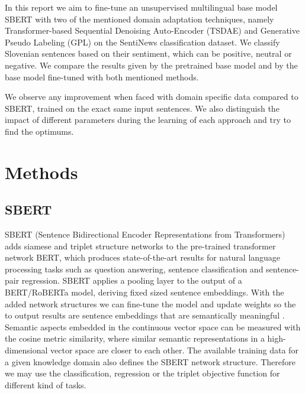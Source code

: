 \documentclass[fleqn,moreauthors,10pt]{ds_report}
\begin{document}
In this report we aim to fine-tune an unsupervised multilingual base model SBERT with two of the mentioned domain adaptation techniques, namely Transformer-based Sequential Denoising Auto-Encoder (TSDAE) and Generative Pseudo Labeling (GPL) on the SentiNews classification dataset. We classify Slovenian sentences based on their sentiment, which can be positive, neutral or negative. We compare the results given by the pretrained base model and by the base model fine-tuned with both mentioned methods.

We observe any improvement when faced with domain specific data compared to SBERT, trained on the exact same input sentences. We also distinguish the impact of different parameters during the learning of each approach and try to find the optimums.






\section*{Methods}

\subsection*{SBERT}
SBERT (Sentence Bidirectional Encoder Representations from Transformers) adds siamese and triplet structure networks to the pre-trained transformer network BERT, which produces state-of-the-art results for natural language processing tasks such as question answering, sentence classification and sentence-pair regression. SBERT applies a pooling layer to the output of a BERT/RoBERTa model, deriving fixed sized sentence embeddings. With the added network structures we can fine-tune the model and update weights so the to output results are sentence embeddings that are semantically meaningful \cite{SBERT}. Semantic aspects embedded in the continuous vector space can be measured with the cosine metric similarity, where similar semantic representations in a high-dimensional vector space are closer to each other. The available training data for a given knowledge domain also defines the SBERT network structure. Therefore we may use the classification, regression or the triplet objective function for different kind of tasks.
\end{document}
